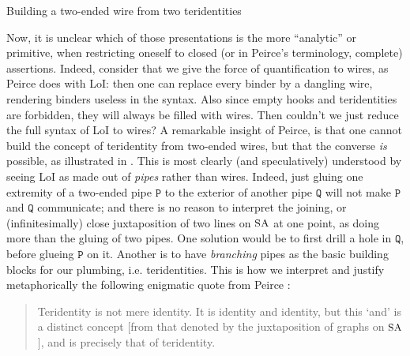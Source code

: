 \begin{marginfigure}
  \begin{center}
  \end{center}
  \caption{Building a two-ended wire from two teridentities}
\end{marginfigure}

Now, it is unclear which of those presentations is the more ``analytic'' or
primitive, when restricting oneself to closed (or in Peirce's terminology,
complete) assertions. Indeed, consider that we give the force of quantification
to wires, as Peirce does with LoI: then one can replace every binder by a
dangling wire, rendering binders useless in the syntax. Also since empty hooks
and teridentities are forbidden, they will always be filled with wires. Then
couldn't we just reduce the full syntax of LoI to wires? A remarkable insight of
Peirce, is that one cannot build the concept of teridentity from two-ended
wires, but that the converse \emph{is} possible, as illustrated in
. This is most clearly (and speculatively) understood
by seeing LoI as made out of \emph{pipes} rather than wires. Indeed, just gluing
one extremity of a two-ended pipe $\mathtt{P}$ to the exterior of another pipe
$\mathtt{Q}$ will not make $\mathtt{P}$ and $\mathtt{Q}$ communicate; and there
is no reason to interpret the joining, or (infinitesimally) close juxtaposition
of two lines on $\small\textsc{SA}$ at one point, as doing more than the gluing of two
pipes. One
solution would be to first drill a hole in $\mathtt{Q}$, before glueing
$\mathtt{P}$ on it. Another is to have \emph{branching} pipes as the basic
building blocks for our plumbing, i.e. teridentities. This is how we interpret
and justify metaphorically the following enigmatic quote from Peirce
\cite[p.~116]{Roberts+1973}:

\begin{quote}
  Teridentity is not mere identity. It is identity and identity, but this `and'
is a distinct concept [from that denoted by the juxtaposition of graphs on
$\small\textsc{SA}$], and is precisely that of teridentity.
\end{quote}

